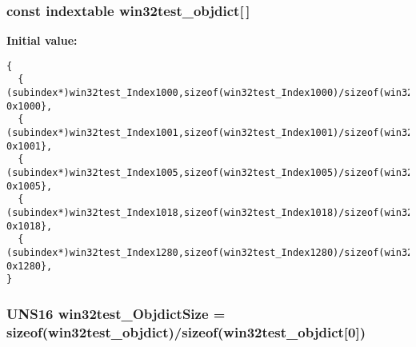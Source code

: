 \subsubsection{\setlength{\rightskip}{0pt plus 5cm}const {\bf indextable} {\bf win32test\_\-objdict}[$\,$]}\label{win32test_8c_02f7c0cfa059c2dfd642f5c61abc9382}


\textbf{Initial value:}

\begin{Code}\begin{verbatim} 
{
  { (subindex*)win32test_Index1000,sizeof(win32test_Index1000)/sizeof(win32test_Index1000[0]), 0x1000},
  { (subindex*)win32test_Index1001,sizeof(win32test_Index1001)/sizeof(win32test_Index1001[0]), 0x1001},
  { (subindex*)win32test_Index1005,sizeof(win32test_Index1005)/sizeof(win32test_Index1005[0]), 0x1005},
  { (subindex*)win32test_Index1018,sizeof(win32test_Index1018)/sizeof(win32test_Index1018[0]), 0x1018},
  { (subindex*)win32test_Index1280,sizeof(win32test_Index1280)/sizeof(win32test_Index1280[0]), 0x1280},
}
\end{verbatim}\end{Code}
\subsubsection{\setlength{\rightskip}{0pt plus 5cm}UNS16 {\bf win32test\_\-Objdict\-Size} = sizeof({\bf win32test\_\-objdict})/sizeof({\bf win32test\_\-objdict}[0])}\label{win32test_8c_d3739d23a317122fa525fa54dcbc64f0}


